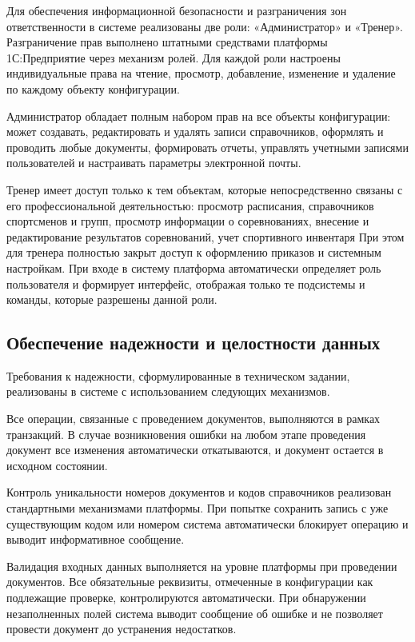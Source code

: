 Для обеспечения информационной безопасности и разграничения зон ответственности в системе реализованы две роли: «Администратор» и «Тренер». Разграничение прав выполнено штатными средствами платформы 1С:Предприятие через механизм ролей. Для каждой роли настроены индивидуальные права на чтение, просмотр, добавление, изменение и удаление по каждому объекту конфигурации.

Администратор обладает полным набором прав на все объекты конфигурации: может создавать, редактировать и удалять записи справочников, оформлять и проводить любые документы, формировать отчеты, управлять учетными записями пользователей и настраивать параметры электронной почты.

Тренер имеет доступ только к тем объектам, которые непосредственно связаны с его профессиональной деятельностью: просмотр расписания, справочников спортсменов и групп, просмотр информации о соревнованиях, внесение и редактирование результатов соревнований, учет спортивного инвентаря При этом для тренера полностью закрыт доступ к оформлению приказов и системным настройкам. При входе в систему платформа автоматически определяет роль пользователя и формирует интерфейс, отображая только те подсистемы и команды, которые разрешены данной роли.

\subsection{Обеспечение надежности и целостности данных}

Требования к надежности, сформулированные в техническом задании, реализованы в системе с использованием следующих механизмов.

Все операции, связанные с проведением документов, выполняются в рамках транзакций. В случае возникновения ошибки на любом этапе проведения документ все изменения автоматически откатываются, и документ остается в исходном состоянии.

Контроль уникальности номеров документов и кодов справочников реализован стандартными механизмами платформы. При попытке сохранить запись с уже существующим кодом или номером система автоматически блокирует операцию и выводит информативное сообщение.

Валидация входных данных выполняется на уровне платформы при проведении документов. Все обязательные реквизиты, отмеченные в конфигурации как подлежащие проверке, контролируются автоматически. При обнаружении незаполненных полей система выводит сообщение об ошибке и не позволяет провести документ до устранения недостатков.

